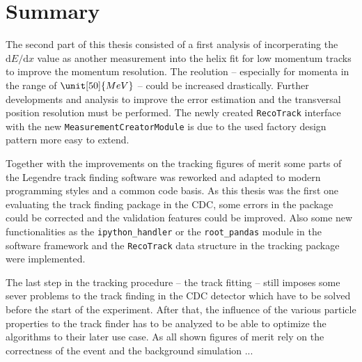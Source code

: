 \chapter{Summary}


The second part of this thesis consisted of a first analysis of incorperating the $\mathrm dE/\mathrm d x$ value as another measurement into the helix fit for low momentum tracks to improve the momentum resolution. The reolution -- especially for momenta in the range of $\unit[50]{MeV}$ -- could be increased drastically. Further developments and analysis to improve the error estimation and the transversal position resolution must be performed. The newly created \texttt{RecoTrack} interface with the new \texttt{MeasurementCreatorModule} is due to the used factory design pattern more easy to extend.

Together with the improvements on the tracking figures of merit some parts of the Legendre track finding software was reworked and adapted to modern programming styles and a common code basis. As this thesis was the first one evaluating the track finding package in the CDC, some errors in the package could be corrected and the validation features could be improved. Also some new functionalities as the \texttt{ipython\_handler} or the \texttt{root\_pandas} module in the software framework and the \texttt{RecoTrack} data structure in the tracking package were implemented.

The last step in the tracking procedure -- the track fitting -- still imposes some sever problems to the track finding in the CDC detector which have to be solved before the start of the experiment. After that, the influence of the various particle properties to the track finder has to be analyzed to be able to optimize the algorithms to their later use case. As all shown figures of merit rely on the correctness of the event and the background simulation ...